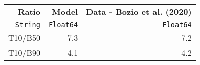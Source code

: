 \begin{tabular}{rrr}
  \hline
  \textbf{Ratio} & \textbf{Model} & \textbf{Data - Bozio et al. (2020)} \\
  \texttt{String} & \texttt{Float64} & \texttt{Float64} \\\hline
  T10/B50 & 7.3 & 7.2 \\
  T10/B90 & 4.1 & 4.2 \\\hline
\end{tabular}

